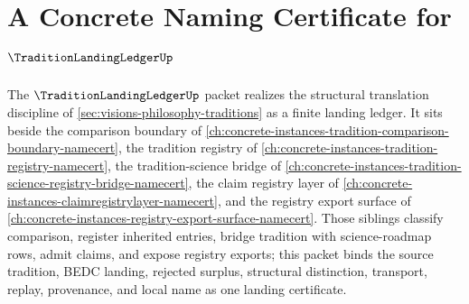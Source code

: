 \chapter{A Concrete Naming Certificate for $\TraditionLandingLedgerUp$}
\label{ch:concrete-instances-tradition-landing-ledger-namecert}

The $\TraditionLandingLedgerUp$ packet realizes the structural translation discipline of \autoref{sec:visions-philosophy-traditions} as a finite landing ledger. It sits beside the comparison boundary of \autoref{ch:concrete-instances-tradition-comparison-boundary-namecert}, the tradition registry of \autoref{ch:concrete-instances-tradition-registry-namecert}, the tradition-science bridge of \autoref{ch:concrete-instances-tradition-science-registry-bridge-namecert}, the claim registry layer of \autoref{ch:concrete-instances-claimregistrylayer-namecert}, and the registry export surface of \autoref{ch:concrete-instances-registry-export-surface-namecert}. Those siblings classify comparison, register inherited entries, bridge tradition with science-roadmap rows, admit claims, and expose registry exports; this packet binds the source tradition, BEDC landing, rejected surplus, structural distinction, transport, replay, provenance, and local name as one landing certificate.

